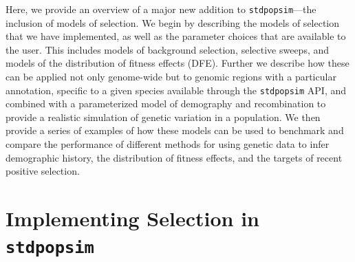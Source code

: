 \documentclass[hidelinks]{article}
\newcommand{\stdpopsim}{\texttt{stdpopsim}\xspace}
\begin{document}
    Here, we provide an overview of a major new addition
    to \stdpopsim---the inclusion of models of selection.
    We begin by describing the models of selection that we have implemented,
    as well as the parameter choices that are available to the user.
    This includes models of background selection, selective sweeps, and
    models of the distribution of fitness effects (DFE).
    Further we describe how these can be applied not only genome-wide but to
    genomic regions with a particular annotation, specific to a given species available
    through the \stdpopsim API, and combined with a parameterized model of
    demography and recombination to provide a realistic simulation of
    genetic variation in a population.
    We then provide a series of examples of how these models can be used
    to benchmark and compare the performance of different methods for
    using genetic data to infer demographic history, the distribution of fitness effects,
    and the targets of recent positive selection. 

\section*{Implementing Selection in \stdpopsim}
    \label{selection}
\end{document}
